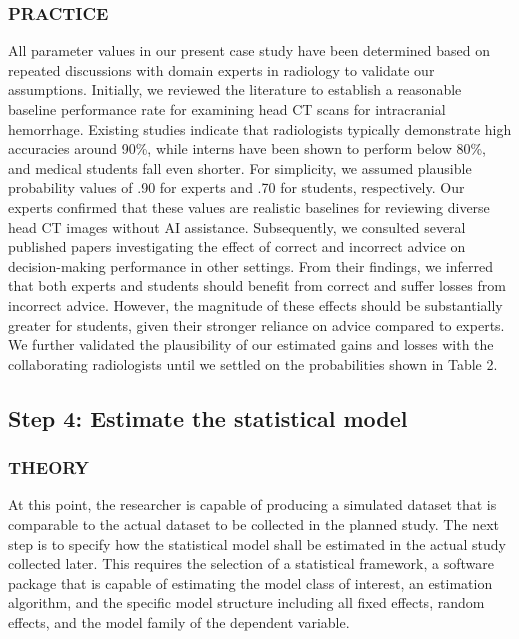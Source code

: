 \documentclass[
  man,
  floatsintext,
  longtable,
  a4paper,
  nolmodern,
  notxfonts,
  notimes,
  colorlinks=true,linkcolor=blue,citecolor=blue,urlcolor=blue]{apa7}
\begin{document}
\subsubsection{PRACTICE}\label{practice-5}

All parameter values in our present case study have been determined
based on repeated discussions with domain experts in radiology to
validate our assumptions. Initially, we reviewed the literature to
establish a reasonable baseline performance rate for examining head CT
scans for intracranial hemorrhage. Existing studies indicate that
radiologists typically demonstrate high accuracies around 90\%, while
interns have been shown to perform below 80\%, and medical students fall
even shorter. For simplicity, we assumed plausible probability values of
.90 for experts and .70 for students, respectively. Our experts
confirmed that these values are realistic baselines for reviewing
diverse head CT images without AI assistance. Subsequently, we consulted
several published papers investigating the effect of correct and
incorrect advice on decision-making performance in other settings. From
their findings, we inferred that both experts and students should
benefit from correct and suffer losses from incorrect advice. However,
the magnitude of these effects should be substantially greater for
students, given their stronger reliance on advice compared to experts.
We further validated the plausibility of our estimated gains and losses
with the collaborating radiologists until we settled on the
probabilities shown in Table 2.

\subsection{Step 4: Estimate the statistical
model}\label{step-4-estimate-the-statistical-model}

\subsubsection{THEORY}\label{theory-6}

At this point, the researcher is capable of producing a simulated
dataset that is comparable to the actual dataset to be collected in the
planned study. The next step is to specify how the statistical model
shall be estimated in the actual study collected later. This requires
the selection of a statistical framework, a software package that is
capable of estimating the model class of interest, an estimation
algorithm, and the specific model structure including all fixed effects,
random effects, and the model family of the dependent variable.
\end{document}
